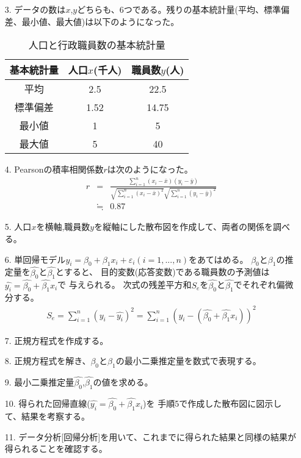 \documentclass[12pt]{jarticle}
\begin{document}
\begin{itemize}
    \item [3.]データの数は$x$,$y$どちらも、6つである。残りの基本統計量(平均、標準偏差、最小値、最大値)は以下のようになった。
          \begin{table}[htb]
              \begin{center}
                  \caption{人口と行政職員数の基本統計量}
                  \begin{tabular}{|c|c|c|} \hline
                      基本統計量 & 人口$x$(千人) & 職員数$y$(人) \\ \hline
                      平均       & 2.5           & 22.5          \\
                      標準偏差   & 1.52          & 14.75         \\
                      最小値     & 1             & 5             \\
                      最大値     & 5             & 40            \\ \hline
                  \end{tabular}
              \end{center}
          \end{table}


    \item [4.]Pearsonの積率相関係数$r$は次のようになった。
          \begin{eqnarray}
              r&=&\frac{\sum_{i=1}^{n} (x_i-\bar{x})(y_i-\bar{y})}{\sqrt{\sum_{i=1}^{n} (x_i-\bar{x})^2} \sqrt{\sum_{i=1}^{n} (y_i-\bar{y})^2}} \nonumber\\
              &\fallingdotseq &0.87 \nonumber
          \end{eqnarray}
    \item [5.]人口$x$を横軸,職員数$y$を縦軸にした散布図を作成して、両者の関係を調べる。
    \item [6.]単回帰モデル$y_i=\beta_0+\beta_1 x_i + \varepsilon_i(i=1,...,n)$をあてはめる。
          $\beta_0$と$\beta_1$の推定量を$\hat{\beta_0}$と$\hat{\beta_1}$とすると、
          目的変数(応答変数)である職員数の予測値は$\hat{y_i}=\hat{\beta_0}+\hat{\beta_1}x_i$で
          与えられる。
          次式の残差平方和$S_e$を$\hat{\beta_0}$と$\hat{\beta_1}$でそれぞれ偏微分する。
          \begin{eqnarray}
              S_e=\sum_{i=1}^{n} (y_i-\hat{y_i})^2 = \sum_{i=1}^{n} (y_i-(\hat{\beta_0}+\hat{\beta_1}x_i))^2
          \end{eqnarray}
    \item [7.]正規方程式を作成する。
    \item [8.]正規方程式を解き、$\beta_0$と$\beta_1$の最小二乗推定量を数式で表現する。
    \item [9.]最小二乗推定量$\hat{\beta_0}$,$\hat{\beta_1}$の値を求める。
    \item [10.]得られた回帰直線($\hat{y_i}=\hat{\beta_0}+\hat{\beta_1}x_i$)を
          手順5で作成した散布図に図示して、結果を考察する。
    \item [11.]データ分析[回帰分析]を用いて、これまでに得られた結果と同様の結果が得られることを確認する。
\end{itemize}
\end{document}
